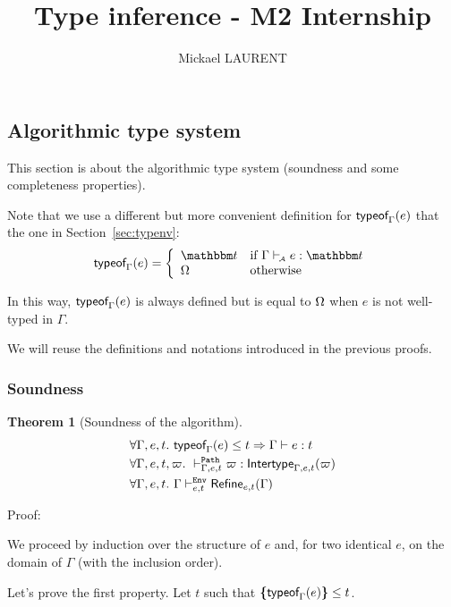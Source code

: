 \documentclass[a4paper]{article}
\title{\vspace{1.5cm}Type inference - M2 Internship}
\author{Mickael LAURENT}
\date{\vspace{-5ex}}
\theoremstyle{definition}
\newtheorem{theorem}{Theorem}
\begin{document}
  \maketitle

  \subsection{Algorithmic type system}

  This section is about the algorithmic type system (soundness and some completeness properties).

  Note that we use a different but more convenient definition for $\textsf{typeof}_{\Gamma}(e)$ that the one
  in Section~\ref{sec:typenv}:
  \begin{align*}
    \tyof e \Gamma = 
    \left\{\begin{array}{ll}
      \ts & \text{if } \Gamma \vdashA e:\ts \\
      \tsempty & \text{otherwise}
    \end{array}\right.
  \end{align*}

  In this way, $\textsf{typeof}_{\Gamma}(e)$ is always defined but is equal to $\Omega$ when $e$ is not
  well-typed in $\Gamma$. 

  We will reuse the definitions and notations introduced in the previous proofs.

  \subsubsection{Soundness}

  \begin{theorem}[Soundness of the algorithm]
    \begin{align*}
      &\forall \Gamma, e, t.\ \textsf{typeof}_{\Gamma}(e) \leq t \Rightarrow \Gamma \vdash e:t\\
      &\forall \Gamma, e, t, \varpi.\ \vdash^{\texttt{Path}}_{\Gamma,e,t} \varpi:\textsf{Intertype}_{\Gamma,e,t} (\varpi)\\
      &\forall \Gamma, e, t.\ \Gamma \vdash^{\texttt{Env}}_{e,t} \textsf{Refine}_{e,t}(\Gamma)
    \end{align*}
  \end{theorem}

  Proof:

  We proceed by induction over the structure of $e$
  and, for two identical $e$, on the domain of $\Gamma$ (with the inclusion order).

  Let's prove the first property.
  Let $t$ such that $\textbf{\textup{\{}}\textsf{typeof}_{\Gamma}(e)\textbf{\textup{\}}} \leq t$.
\end{document}
